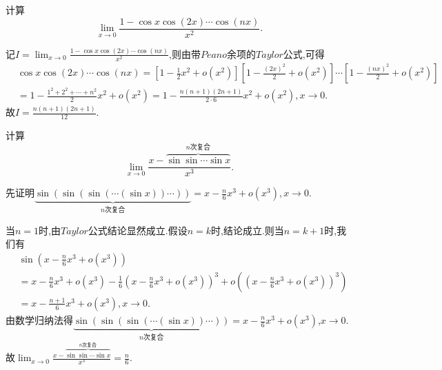 \documentclass[lang=cn,newtx,10pt,scheme=chinese]{elegantbook}
\begin{document}
\begin{example}
计算
\[
\lim_{x \to 0} \frac{1 - \cos x \cos(2x) \cdots \cos(nx)}{x^2}.
\]
\end{example}
\begin{solution}
记$I=\lim_{x \to 0} \frac{1 - \cos x \cos(2x) \cdots \cos(nx)}{x^2}$,则由带$Peano$余项的$Taylor$公式,可得
\begin{align*}
&\cos x \cos(2x) \cdots \cos(nx)
=\left[1 - \frac{1}{2}x^2 + o(x^2)\right]\left[1 - \frac{(2x)^2}{2} + o(x^2)\right] \cdots \left[1 - \frac{(nx)^2}{2} + o(x^2)\right]
\\
&= 1 - \frac{1^2 + 2^2 + \cdots + n^2}{2}x^2 + o(x^2)
= 1 - \frac{n(n + 1)(2n + 1)}{2 \cdot 6}x^2 + o(x^2),x\to0.
\end{align*}
故\(I = \frac{n(n + 1)(2n + 1)}{12}\).
\end{solution}

\begin{example}
计算
\[
\lim_{x\rightarrow 0} \frac{x-\overset{n\text{次复合}}{\overbrace{\sin\sin \cdots \sin x}}}{x^3}.
\]
\end{example}
\begin{solution}
先证明\(\underbrace{\sin(\sin(\sin(\cdots (\sin x))\cdots))}_{n\text{次复合}} = x - \frac{n}{6}x^3 + o(x^3),x\to0\).

当\(n = 1\)时,由$Taylor$公式结论显然成立.假设\(n=k\)时,结论成立.则当\(n=k + 1\)时,我们有
\begin{align*}
&\sin\left(x - \frac{n}{6}x^3 + o(x^3)\right)
\\
&= x - \frac{n}{6}x^3 + o(x^3) - \frac{1}{6}\left(x - \frac{n}{6}x^3 + o(x^3)\right)^3 + o\left(\left(x - \frac{n}{6}x^3 + o(x^3)\right)^3\right)
\\
&= x - \frac{n + 1}{6}x^3 + o(x^3),x\to0.
\end{align*}
由数学归纳法得\(\underbrace{\sin(\sin(\sin(\cdots (\sin x))\cdots))}_{n\text{次复合}} = x - \frac{n}{6}x^3 + o(x^3)\),$x\to0$.
故$\lim_{x\rightarrow 0} \frac{x-\overset{n\text{次复合}}{\overbrace{\sin\sin \cdots \sin x}}}{x^3}=\frac{n}{6}.$
\end{solution}
\end{document}
